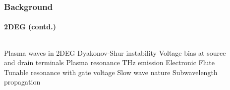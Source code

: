 \documentclass[mathserif,16pt,xcolor=table]{beamer}
\begin{document}
  \begin{frame}
    \frametitle{Background}
    \framesubtitle{2DEG (contd.)}

    \begin{columns} %
      \begin{column}{.5\textwidth}
        \begin{minipage}[T][.1\textheight][c]{\linewidth}
          \begin{outline}[itemize]
            \1 Plasma waves in 2DEG
            \1 Dyakonov-Shur instability
            \2 Voltage bias at source and drain terminals
            \2 Plasma resonance
            \2 THz emission
            \1 Electronic Flute
            \2 Tunable resonance with gate voltage
            \1 Slow wave nature
              \2 Subwavelength propagation
          \end{outline}
        \end{minipage}
      \end{column}
      \begin{column}{.5\textwidth}
        \vspace*{-1cm}
        \begin{figure}
          \hspace*{-.55cm}
          \fontsize{6}{7}\selectfont
          \def\svgwidth{1.1\linewidth}
          
        \end{figure}
        \centering
        \begin{figure}
        \end{figure}
        \end{column}%
      \end{columns}
    \end{frame}
\end{document}
